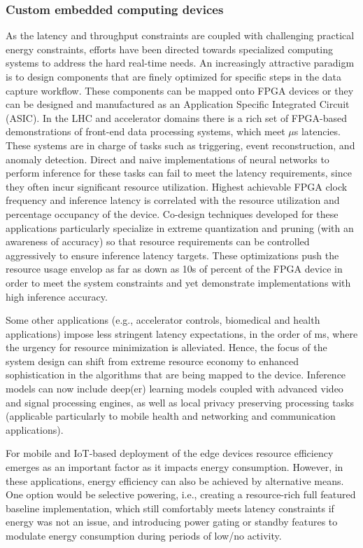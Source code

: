 \subsubsection{Custom embedded computing devices}
As the latency and throughput constraints are coupled with challenging practical energy constraints, efforts have been directed towards specialized computing systems to address the hard real-time needs. An increasingly attractive paradigm is to design components that are finely optimized for specific steps in the data capture workflow. These components can be mapped onto FPGA devices or they can be designed and manufactured as an Application Specific Integrated Circuit (ASIC). In the LHC and accelerator domains there is a rich set of FPGA-based demonstrations of front-end data processing systems, which meet $\mu$s latencies. These systems are in charge of tasks such as triggering, event reconstruction, and anomaly detection. Direct and naive implementations of neural networks to perform inference for these tasks can fail to meet the latency requirements, since they often incur significant resource utilization. Highest achievable FPGA clock frequency and inference latency is correlated with the resource utilization and percentage occupancy of the device. Co-design techniques developed for these applications particularly specialize in extreme quantization and pruning (with an awareness of accuracy) so that resource requirements can be controlled aggressively to ensure inference latency targets. These optimizations push the resource usage envelop as far as down as 10s of percent of the FPGA device in order to meet the system constraints and yet demonstrate implementations with high inference accuracy.

Some other applications (e.g., accelerator controls, biomedical and health applications) impose less stringent latency expectations, in the order of ms, where the urgency for resource minimization is alleviated. Hence, the focus of the system design can shift from extreme resource economy to enhanced sophistication in the algorithms that are being mapped to the device. Inference models can now include deep(er) learning models coupled with advanced video and signal processing engines, as well as local privacy preserving processing tasks (applicable particularly to mobile health and networking and communication applications). 

For mobile and IoT-based deployment of the edge devices resource efficiency emerges as an important factor as it impacts energy consumption. However, in these applications, energy efficiency can also be achieved by alternative means. One option would be selective powering, i.e., creating a resource-rich full featured baseline implementation, which still comfortably meets latency constraints if energy was not an issue, and introducing power gating or standby features to modulate energy consumption during periods of low/no activity. 

